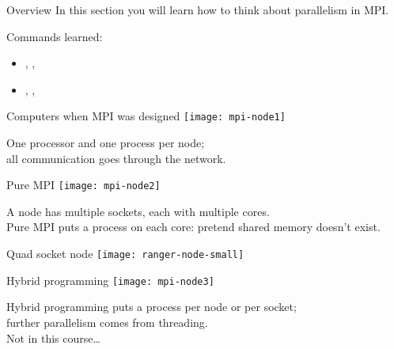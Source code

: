 
\begin{numberedframe}{Overview}
  In this section you will learn how to think about parallelism in
  MPI.

  Commands learned:
  \begin{itemize}
  \item
    , ,
  \item 
    , ,
  \end{itemize}
\end{numberedframe}


\begin{numberedframe}{Computers when MPI was designed}
  \texttt{[image: mpi-node1]}

  One processor and one  process per node;\\
  all communication goes through the network.
\end{numberedframe}

\begin{numberedframe}{Pure MPI}
  \texttt{[image: mpi-node2]}

  A node has multiple sockets, each with multiple cores.\\
  Pure MPI puts a process on each core: pretend shared memory doesn't exist.
\end{numberedframe}

\begin{numberedframe}{Quad socket node}
  \texttt{[image: ranger-node-small]}
\end{numberedframe}

\begin{numberedframe}{Hybrid programming}
  \texttt{[image: mpi-node3]}

  Hybrid programming puts a process per node or per socket;\\
  further parallelism comes from threading.\\
  Not in this course\ldots
\end{numberedframe}

